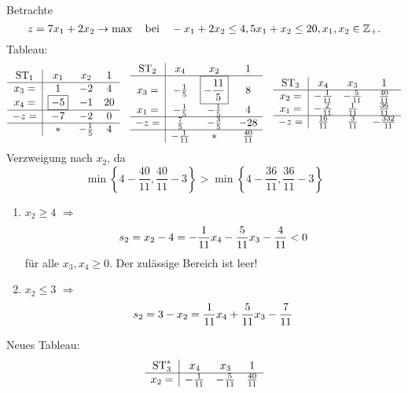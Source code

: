 \setcounter{exmp}{2}
\begin{exmp} %
  Betrachte
  \[ z = 7 x_1 + 2 x_2 \to \max \quad \text{bei} \quad -x_1 + 2 x_2 \le 4, 5x_1 + x_2 \le 20,
    x_1, x_2 \in \mathbb{Z}_+. \]
  Tableau:
  \[
    \begin{array}{c|ccc}
      \operatorname*{ST}_1 & x_1 & x_2 & 1 \\
      \hline
      x_3 = & 1 & -2 & 4 \\
      x_4 = & \boxed{-5} & -1 & 20 \\
      \hline
      - z = & -7 & -2 & 0 \\
      \hline
            & \ast & - \frac{1}{5} & 4
    \end{array}
    \quad
    \begin{array}{c|ccc}
      \operatorname*{ST}_2 & x_4 & x_2 & 1 \\
      \hline
      x_3 = & -\frac{1}{5} & \boxed{-\frac{11}{5}} & 8 \\
      x_1 = & -\frac{1}{5} & -\frac{1}{5} & 4 \\
      \hline
      - z = & \frac{7}{5} & -\frac{3}{5} & -28 \\
      \hline
            & -\frac{1}{11} & \ast & \frac{40}{11}
    \end{array}
    \quad
    \begin{array}{c|ccc}
      \operatorname*{ST}_3 & x_4 & x_3 & 1 \\
      \hline
      x_2 = & -\frac{1}{11} & -\frac{5}{11} & \frac{40}{11} \\
      x_1 = & -\frac{2}{11} & \frac{1}{11} & \frac{36}{11} \\
      \hline
      - z = & \frac{16}{11} & \frac{3}{11} & -\frac{332}{11}
    \end{array}
  \]
  Verzweigung nach $x_2$, da
  \[ \min \left\{ 4 - \frac{40}{11}, \frac{40}{11}-3 \right\} >
    \min \left\{ 4 - \frac{36}{11}, \frac{36}{11}-3 \right\} \]
  \begin{enumerate}[1. TP:]
  \item $x_2 \ge 4$ $\Rightarrow$
    \[ s_2 = x_2 - 4 = -\frac{1}{11} x_4 - \frac{5}{11} x_3 - \frac{4}{11} < 0 \]
    für alle $x_3, x_4 \ge 0$. Der zulässige Bereich ist leer!
  \item $x_2 \le 3$ $\Rightarrow$
    \[ s_2 = 3 - x_2 = \frac{1}{11} x_4 + \frac{5}{11} x_3 - \frac{7}{11}\]
  \end{enumerate}
  Neues Tableau:
  \[
    \begin{array}{c|ccc}
      \operatorname*{ST}_3^* & x_4 & x_3 & 1 \\
      \hline
      x_2 = & -\frac{1}{11} & -\frac{5}{11} & \frac{40}{11} \\

\end{array}\]
\end{exmp}

